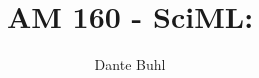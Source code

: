\documentclass{article}
\begin{document}
\title{AM 160 - SciML:}
\author{Dante Buhl}


\newcommand{\wrms}{w_{\text{rms}}}
\newcommand{\bs}[1]{\boldsymbol{#1}}
\newcommand{\tb}[1]{\textbf{#1}}
\newcommand{\bmp}[1]{\begin{minipage}{#1\textwidth}}
\newcommand{\emp}{\end{minipage}}
\newcommand{\R}{\mathbb{R}}
\newcommand{\C}{\mathbb{C}}
\newcommand{\N}{\mathcal{N}}
\newcommand{\K}{\bs{\mathrm{K}}}
\newcommand{\m}{\bs{\mu}_*}
\newcommand{\s}{\bs{\Sigma}_*}
\newcommand{\dt}{\Delta t}
\newcommand{\dx}{\Delta x}
\newcommand{\tr}[1]{\text{Tr}(#1)}
\newcommand{\Tr}[1]{\text{Tr}(#1)}
\newcommand{\Div}{\nabla \cdot}
\renewcommand{\div}{\nabla \cdot}
\newcommand{\Curl}{\nabla \times}
\newcommand{\Grad}{\nabla}
\newcommand{\grad}{\nabla}
\newcommand{\grads}{\nabla_s}
\newcommand{\gradf}{\nabla_f}
\newcommand{\xs}{x_s}
\newcommand{\xf}{x_f}
\newcommand{\ts}{t_s}
\newcommand{\tf}{t_f}
\newcommand{\pt}{\partial t}
\newcommand{\pz}{\partial z}
\newcommand{\uvec}{\bs{u}}
\newcommand{\F}{\bs{F}}
\newcommand{\T}{\tilde{T}}
\newcommand{\ez}{\bs{e}_z}
\newcommand{\ex}{\bs{e}_x}
\newcommand{\ey}{\bs{e}_y}
\newcommand{\eo}{\bs{e}_{\bs{\Omega}}}
\newcommand{\ppt}[1]{\frac{\partial #1}{\partial t}}
\newcommand{\DDt}[1]{\frac{D #1}{D t}}
\newcommand{\ppts}[1]{\frac{\partial #1}{\partial t_s}}
\newcommand{\pptf}[1]{\frac{\partial #1}{\partial t_f}}
\newcommand{\ppz}[1]{\frac{\partial #1}{\partial z}}
\newcommand{\ddz}[1]{\frac{d #1}{d z}}
\newcommand{\ppzetas}[1]{\frac{\partial^2 #1}{\partial \zeta^2}}
\newcommand{\ppzs}[1]{\frac{\partial #1}{\partial z_s}}
\newcommand{\ppzf}[1]{\frac{\partial #1}{\partial z_f}}
\newcommand{\ppx}[1]{\frac{\partial #1}{\partial x}}
\newcommand{\ppxi}[1]{\frac{\partial #1}{\partial x_i}}
\newcommand{\ppxj}[1]{\frac{\partial #1}{\partial x_j}}
\newcommand{\ppy}[1]{\frac{\partial #1}{\partial y}}
\newcommand{\ppzeta}[1]{\frac{\partial #1}{\partial \zeta}}


\maketitle 
\setlength{\parindent}{0pt}
\doublespacing

\setcounter{section}{1}
\section{}
\end{document}
